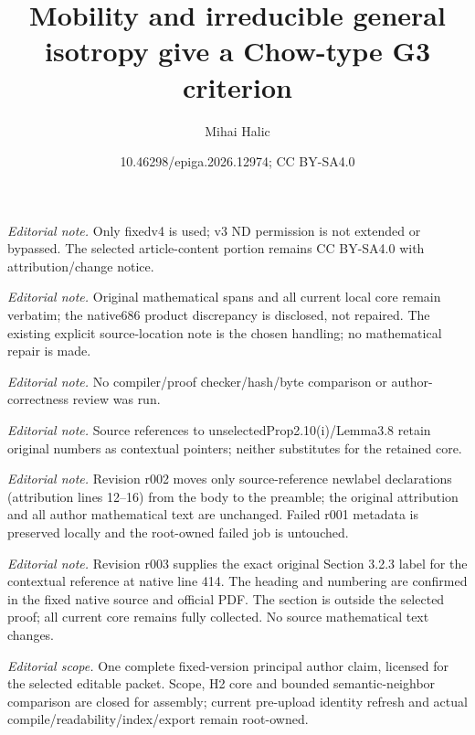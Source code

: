 \documentclass[10pt,a4paper]{article}
\title{Mobility and irreducible general isotropy give a Chow-type G3 criterion}
\author{Mihai Halic}
\date{10.46298/epiga.2026.12974; CC BY-SA4.0}
\numberwithin{equation}{section}
\theoremstyle{definition}
\theoremstyle{remark}
\begin{document}
\maketitle
\noindent\textit{Editorial note.} Only fixedv4 is used; v3 ND permission is not extended or bypassed. The selected article-content portion remains CC BY-SA4.0 with attribution/change notice.\par\medskip
\noindent\textit{Editorial note.} Original mathematical spans and all current local core remain verbatim; the native686 product discrepancy is disclosed, not repaired. The existing explicit source-location note is the chosen handling; no mathematical repair is made.\par\medskip
\noindent\textit{Editorial note.} No compiler/proof checker/hash/byte comparison or author-correctness review was run.\par\medskip
\noindent\textit{Editorial note.} Source references to unselectedProp2.10(i)/Lemma3.8 retain original numbers as contextual pointers; neither substitutes for the retained core.\par\medskip
\noindent\textit{Editorial note.} Revision r002 moves only source-reference newlabel declarations (attribution lines 12–16) from the body to the preamble; the original attribution and all author mathematical text are unchanged. Failed r001 metadata is preserved locally and the root-owned failed job is untouched.\par\medskip
\noindent\textit{Editorial note.} Revision r003 supplies the exact original Section 3.2.3 label for the contextual reference at native line 414. The heading and numbering are confirmed in the fixed native source and official PDF. The section is outside the selected proof; all current core remains fully collected. No source mathematical text changes.\par\medskip
\noindent\textit{Editorial scope.} One complete fixed-version principal author claim, licensed for the selected editable packet. Scope, H2 core and bounded semantic-neighbor comparison are closed for assembly; current pre-upload identity refresh and actual compile/readability/index/export remain root-owned.\par\medskip
\end{document}
